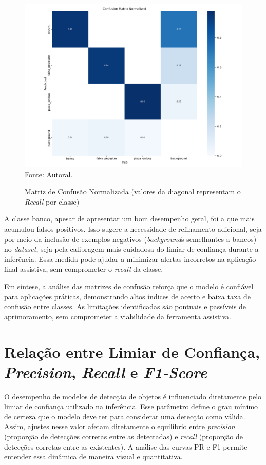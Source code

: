 \begin{figure}[htbp]
  \centering
  \caption{Matriz de Confusão Normalizada (valores da diagonal representam o \textit{Recall} por classe)}
  \includegraphics[width=1\textwidth]{Figuras/confusion_matrix_normalized.png}
  \\
  Fonte: Autoral.
  \label{fg-confusion_matrix_normalized}
\end{figure}

A classe banco, apesar de apresentar um bom desempenho geral, foi a que mais acumulou falsos positivos. Isso sugere a necessidade de refinamento adicional, seja por meio da inclusão de exemplos negativos (\textit{background}s semelhantes a bancos) no \textit{dataset}, seja pela calibragem mais cuidadosa do limiar de confiança durante a inferência. Essa medida pode ajudar a minimizar alertas incorretos na aplicação final assistiva, sem comprometer o \textit{recall} da classe.

Em síntese, a análise das matrizes de confusão reforça que o modelo é confiável para aplicações práticas, demonstrando altos índices de acerto e baixa taxa de confusão entre classes. As limitações identificadas são pontuais e passíveis de aprimoramento, sem comprometer a viabilidade da ferramenta assistiva.


\section{Relação entre Limiar de Confiança, \textit{Precision}, \textit{Recall} e \textit{F1-Score}}

O desempenho de modelos de detecção de objetos é influenciado diretamente pelo limiar de confiança utilizado na inferência. Esse parâmetro define o grau mínimo de certeza que o modelo deve ter para considerar uma detecção como válida. Assim, ajustes nesse valor afetam diretamente o equilíbrio entre \textit{precision} (proporção de detecções corretas entre as detectadas) e \textit{recall} (proporção de detecções corretas entre as existentes). A análise das curvas PR e F1 permite entender essa dinâmica de maneira visual e quantitativa.

